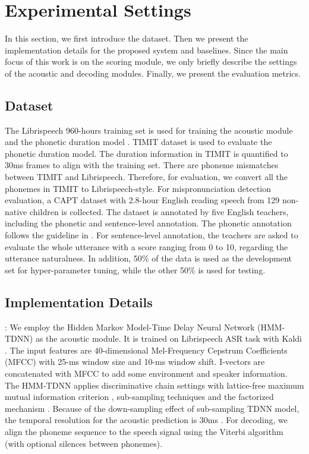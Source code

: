 \documentclass[a4paper]{article}
\begin{document}
\section{Experimental Settings}
In this section, we first introduce the dataset. Then we present the implementation details for the proposed system and baselines. Since the main focus of this work is on the scoring module, we only briefly describe the settings of the acoustic and decoding modules. Finally, we present the evaluation metrics.
\vspace{-6pt}
\subsection{Dataset}
The Librispeech 960-hours training set is used for training the acoustic module and the phonetic duration model \cite{panayotov2015librispeech}. 
TIMIT \cite{garofolo1993darpa} dataset is used to evaluate the phonetic duration model. 
The duration information in TIMIT is quantified to 30ms frames to align with the training set. There are phoneme mismatches between TIMIT and Librispeech. Therefore, for evaluation, we convert all the phonemes in TIMIT to Librispeech-style. 
For mispronunciation detection evaluation, a CAPT dataset with 2.8-hour English reading speech from 129 non-native children is collected. The dataset is annotated by five English teachers, including the phonetic and sentence-level annotation. The phonetic annotation follows the guideline in \cite{witt1999use}. For sentence-level annotation, the teachers are asked to evaluate the whole utterance with a score ranging from 0 to 10, regarding the utterance naturalness. In addition, 50\% of the data is used as the development set for hyper-parameter tuning, while the other 50\% is used for testing.
\vspace{-6pt}
\subsection{Implementation Details}

:
We employ the Hidden Markov Model-Time Delay Neural Network (HMM-TDNN) as the acoustic module. It is trained on Librispeech ASR task with Kaldi \cite{povey2011kaldi}. The input features are 40-dimensional Mel-Frequency Cepstrum Coefficients (MFCC) with 25-ms window size and 10-ms window shift. I-vectors are concatenated with MFCC to add some environment and speaker information. The HMM-TDNN applies discriminative chain settings with lattice-free maximum mutual information criterion \cite{povey2016purely}, sub-sampling techniques and the factorized mechanism \cite{peddinti2015time, povey2018semi}. Because of the down-sampling effect of sub-sampling TDNN model, the temporal resolution for the acoustic prediction is 30ms \cite{peddinti2015time}. For decoding, we align the phoneme sequence to the speech signal using the Viterbi algorithm (with optional silences between phonemes).
\end{document}
